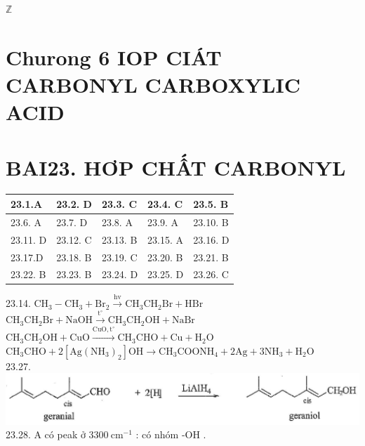 \documentclass[10pt]{article}
\begin{document}
$\mathbb{Z}$

\section*{Churong 6 IOP CIÁT CARBONYL CARBOXYLIC ACID}
\section*{BAI23. HƠP CHẤT CARBONYL}
\begin{center}
\begin{tabular}{|l|l|l|l|l|}
\hline
23.1.A & 23.2. D & 23.3. C & 23.4. C & 23.5. B \\
\hline
23.6. A & 23.7. D & 23.8. A & 23.9. A & 23.10. B \\
\hline
23.11. D & 23.12. C & 23.13. B & 23.15. A & 23.16. D \\
\hline
23.17.D & 23.18. B & 23.19. C & 23.20. B & 23.21. B \\
\hline
23.22. B & 23.23. B & 23.24. D & 23.25. D & 23.26. C \\
\hline
\end{tabular}
\end{center}

23.14. $\mathrm{CH}_{3}-\mathrm{CH}_{3}+\mathrm{Br}_{2} \xrightarrow{\mathrm{hv}} \mathrm{CH}_{3} \mathrm{CH}_{2} \mathrm{Br}+\mathrm{HBr}$\\
$\mathrm{CH}_{3} \mathrm{CH}_{2} \mathrm{Br}+\mathrm{NaOH} \xrightarrow{\mathrm{t}^{\circ}} \mathrm{CH}_{3} \mathrm{CH}_{2} \mathrm{OH}+\mathrm{NaBr}$\\
$\mathrm{CH}_{3} \mathrm{CH}_{2} \mathrm{OH}+\mathrm{CuO} \xrightarrow{\mathrm{CuO}, \mathrm{t}^{\circ}} \mathrm{CH}_{3} \mathrm{CHO}+\mathrm{Cu}+\mathrm{H}_{2} \mathrm{O}$\\
$\mathrm{CH}_{3} \mathrm{CHO}+2\left[\mathrm{Ag}\left(\mathrm{NH}_{3}\right)_{2}\right] \mathrm{OH} \longrightarrow \mathrm{CH}_{3} \mathrm{COONH}_{4}+2 \mathrm{Ag}+3 \mathrm{NH}_{3}+\mathrm{H}_{2} \mathrm{O}$\\
23.27.\\
\includegraphics[max width=\textwidth, center]{2025_10_23_ed7118e3280f74e91193g-37}\\
23.28. A có peak ở $3300 \mathrm{~cm}^{-1}$ : có nhóm -OH .
\end{document}
